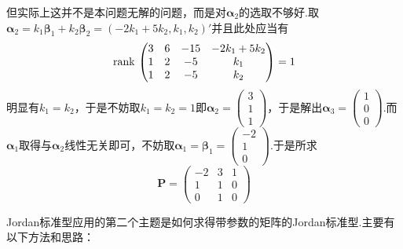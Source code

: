 {\begin{solution}
        但实际上这并不是本问题无解的问题，而是对$\bm{\alpha}_2$的选取不够好.取$\bm{\alpha}_2=k_1\bm{\beta}_1+k_2\bm{\beta}_2=\left(
            -2k_1+5k_2,k_1,k_2
            \right)'$并且此处应当有\[
            \operatorname{rank\,} \begin{pmatrix}
                3 & 6 & -15 & -2k_1+5k_2 \\1&2&-5&k_1\\1 & 2 & -5 & k_2
            \end{pmatrix}=1
        \]明显有$k_1=k_2$，于是不妨取$k_1=k_2=1$即$\bm{\alpha}_2=\begin{pmatrix}
                3 \\1\\1
            \end{pmatrix}$，于是解出$\bm{\alpha}_3=\begin{pmatrix}
                1 \\0\\0
            \end{pmatrix}$.而$\bm{\alpha}_1$取得与$\bm{\alpha}_2$线性无关即可，不妨取$\bm{\alpha}_1=\bm{\beta}_1=\begin{pmatrix}
                -2 \\1\\0
            \end{pmatrix}$.于是所求\[
            \bm{P}= \begin{pmatrix}
                -2 & 3 & 1 \\1&1&0\\0 & 1 & 0
            \end{pmatrix}
        \]
    \end{solution}
}
Jordan标准型应用的第二个主题是如何求得带参数的矩阵的Jordan标准型.主要有以下方法和思路：

